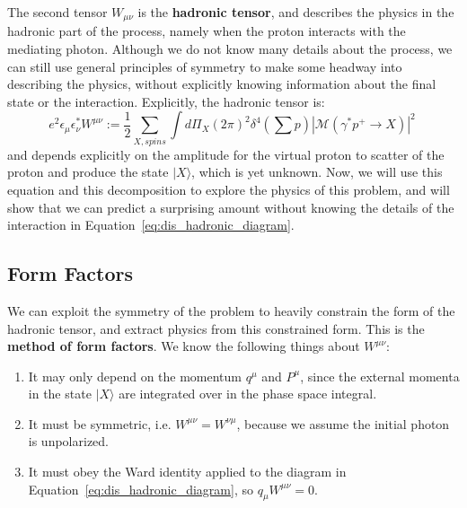 \documentclass[11pt, oneside]{article}   	%
\theoremstyle{definition}
\begin{document}
The second tensor $W_{\mu\nu}$ is the \textbf{hadronic tensor}, and describes the physics in the hadronic part of the process, 
namely when the proton interacts with the mediating photon. Although we do not know many details about the process, we can still 
use general principles of symmetry to make some headway into describing the physics, without explicitly knowing information 
about the final state or the interaction. Explicitly, the hadronic tensor is:
\begin{equation}
	e^2\epsilon_\mu\epsilon_\nu^* W^{\mu\nu} := \frac{1}{2}\sum_{X, spins} \int d\Pi_X (2\pi)^2\delta^4\left(\sum p\right)
	|\mathcal M(\gamma^*p^+\rightarrow X)|^2~
	\label{eq:hadronic_tensor}
\end{equation}
and depends explicitly on the amplitude for the virtual proton to scatter of the proton and produce the state $|X\rangle$, which is 
yet unknown. Now, we will use this equation and this decomposition to explore the physics of this problem, and will show that 
we can predict a surprising amount without knowing the details of the interaction in Equation~\ref{eq:dis_hadronic_diagram}.

\subsection{Form Factors}

We can exploit the symmetry of the problem to heavily constrain the form of the hadronic tensor, and 
extract physics from this constrained form. This is the \textbf{method of form factors}. We know the following things about 
$W^{\mu\nu}$:
\begin{enumerate}
	\item It may only depend on the momentum $q^\mu$ and $P^\mu$, since the external momenta in the state $|X\rangle$ are 
	integrated over in the phase space integral. 
	\item It must be symmetric, i.e. $W^{\mu\nu} = W^{\nu\mu}$, because we assume the initial photon is unpolarized. 
	\item It must obey the Ward identity applied to the diagram in Equation~\ref{eq:dis_hadronic_diagram}, so $q_\mu W^{\mu\nu} = 0$. 
\end{enumerate}
\end{document}
